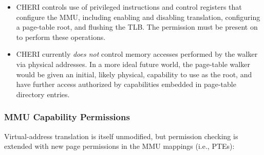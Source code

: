 \begin{itemize}
\item CHERI controls use of privileged instructions and control registers that
  configure the MMU, including enabling and disabling translation, configuring
  a page-table root, and flushing the TLB.
  The \cappermASR* permission must be present on \PCC{} to perform these
  operations.

\item CHERI currently
  \textit{does not} control memory accesses performed by the walker via
  physical addresses.
  In a more ideal future world, the page-table walker would be given an
  initial, likely physical, capability to use as the root, and have further
  access authorized by capabilities embedded in page-table directory entries.
\end{itemize}

\subsubsection{MMU Capability Permissions}

Virtual-address translation is itself unmodified, but permission checking is
extended with new page permissions in the MMU mappings (i.e., PTEs):

